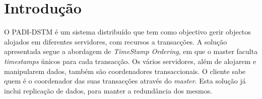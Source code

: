 \section{Introdução}

O PADI-DSTM é um sistema distribuído que tem como objectivo gerir objectos alojados em diferentes servidores, com recursos a transacções. A solução apresentada segue a abordagem de \textit{TimeStamp Ordering}, em que o master faculta \textit{timestamps} únicos para cada transacção. Os vários servidores, além de alojarem e manipularem dados, também são coordenadores transaccionais. O cliente sabe quem é o coordenador das suas transacções através do \textit{master}. Esta solução já inclui replicação de dados, para manter a redundância dos mesmos.
